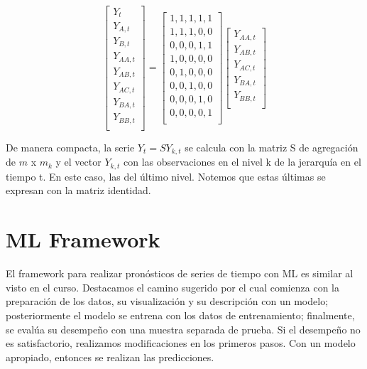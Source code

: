 \begin{equation}
    \begin{bmatrix}
    Y_t\\
    Y_{A,t}\\
    Y_{B,t}\\
    Y_{AA,t}\\
    Y_{AB,t}\\
    Y_{AC,t}\\
    Y_{BA,t}\\
    Y_{BB,t}\\
    \end{bmatrix} = 
    \begin{bmatrix}
    1,1,1,1,1\\
    1,1,1,0,0\\
    0,0,0,1,1\\
    1,0,0,0,0\\
    0,1,0,0,0\\
    0,0,1,0,0\\
    0,0,0,1,0\\
    0,0,0,0,1\\
    \end{bmatrix}
    \begin{bmatrix}
    Y_{AA,t}\\
    Y_{AB,t}\\
    Y_{AC,t}\\
    Y_{BA,t}\\
    Y_{BB,t}\\
    \end{bmatrix}
\end{equation}

De manera compacta, la serie \textbf{$Y_t = SY_{k,t}$} se calcula con la matriz S de agregación de $m$ x $m_k$ y el vector $Y_{k,t}$ con las observaciones en el nivel k de la jerarquía en el tiempo t. En este caso, las del último nivel. Notemos que estas últimas se expresan con la matriz identidad.

\section{ML Framework}

El framework para realizar pronósticos de series de tiempo con ML es similar al visto en el curso. Destacamos el camino sugerido por \cite{hyndman2018forecasting} el cual comienza con la preparación de los datos, su visualización y su descripción con un modelo; posteriormente el modelo se entrena con los datos de entrenamiento; finalmente, se evalúa su desempeño con una muestra separada de prueba. Si el desempeño no es satisfactorio, realizamos modificaciones en los primeros pasos. Con un modelo apropiado, entonces se realizan las predicciones.

